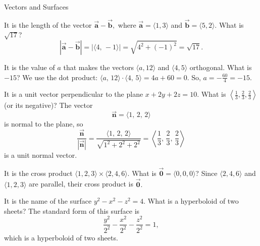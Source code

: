 \documentclass{article}
\newcommand{\bvec}[1]{\vec{\mathbf{#1}}}
\newcommand{\dotprod}{\cdot}
\begin{document}
\begin{category}{Vectors and Surfaces}

  \begin{clue}[say]
    It is the length of the vector $\bvec{a}-\bvec{b},$ where $\bvec{a} = \langle1,3\rangle$ and $\bvec{b} = \langle5,2\rangle.$
  \response
    What is $\sqrt{17}$?
  \solution
    \[
    \left|\bvec{a}-\bvec{b}\right|=\left|\langle 4,\,-1\rangle\right|=\sqrt{4^2+(-1)^2}=\sqrt{17}.
    \]
  \end{clue}

  \begin{clue}[say]
    It is the value of $a$ that makes the vectors $\langle a,12\rangle$ and $\langle4,5\rangle$ orthogonal.
  \response
    What is $-15$?
  \solution
    We use the dot product:
    $\langle a,\,12\rangle \dotprod \langle 4,\,5\rangle = 4a+60=0.$ So, $a=-\frac{60}{4}=-15.$
  \end{clue}

  \begin{clue}[write]
    It is a unit vector perpendicular to the plane $x+2y+2z=10.$
  \response
    What is $\left\langle \frac{1}{3}, \frac{2}{3}, \frac{2}{3}\right\rangle$ (or its negative)?
  \solution
    The vector
    \[
    \bvec{n}=\langle 1,\,2,\,2\rangle
    \]
    is normal to the plane, so
    \[
    \frac{\bvec{n}}{|\bvec{n}|}=\frac{\langle 1,\,2,\,2\rangle}{\sqrt{1^2+2^2+2^2}}=\left\langle \frac{1}{3},\,\frac{2}{3},\,\frac{2}{3}\right\rangle
    \]
    is a unit normal vector.
  \end{clue}

  \begin{clue}[say]
    It is the cross product $\langle 1,2,3\rangle\times\langle 2,4,6\rangle.$
  \response
    What is $\bvec{0}=\langle 0,0,0\rangle$?
  \solution
    Since $\langle 2,4,6\rangle$ and $\langle 1,2,3\rangle$ are parallel, their cross product is $\bvec{0}.$
  \end{clue}

  \begin{clue}[say]
    It is the name of the surface $y^2-x^2-z^2=4.$
  \response
    What is a hyperboloid of two sheets?
  \solution
    The standard form of this surface is \[\frac{y^2}{2^2}-\frac{x^2}{2^2}-\frac{z^2}{2^2}=1,\] which is a hyperboloid of two sheets.
  \end{clue}

\end{category}
\end{document}
